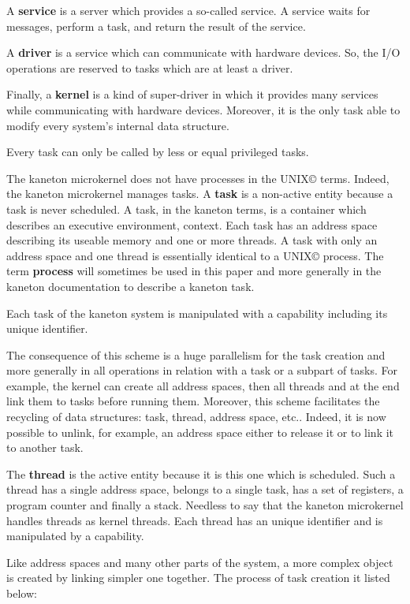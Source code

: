 \begin{multicols}{2}
A \textbf{service} is a server which provides a so-called service. A service
waits for messages, perform a task, and return the result of the service.

A \textbf{driver} is a service which can communicate with hardware devices.
So, the I/O operations are reserved to tasks which are at least a driver.

Finally, a \textbf{kernel} is a kind of super-driver in which it provides
many services while communicating with hardware devices. Moreover, it is
the only task able to modify every system's internal data structure.

Every task can only be called by less or equal privileged tasks.

The kaneton microkernel does not have processes in the
UNIX{\scriptsize \copyright} terms. Indeed, the kaneton microkernel manages
tasks. A \textbf{task} is a non-active entity because a task is never scheduled.
A task, in the kaneton terms, is a container which describes an executive
environment, context. Each task has an address space describing its useable
memory and one or more threads. A task with only an address space and one
thread is essentially identical to a UNIX{\scriptsize \copyright} process.
The term \textbf{process} will sometimes be used in this paper and more
generally in the kaneton documentation to describe a kaneton task.

Each task of the kaneton system is manipulated with a capability including
its unique identifier.

The consequence of this scheme is a huge parallelism for the
task creation and more generally in all operations in relation with
a task or a subpart of tasks. For example, the kernel can create all
address spaces, then all threads and at the end link them to tasks before
running them. Moreover, this scheme facilitates the recycling of data
structures: task, thread, address space, etc.. Indeed, it is now possible to
unlink, for example, an address space either to release it or to link it to
another task.

The \textbf{thread} is the active entity because it is this one which is
scheduled. Such a thread has a single address space, belongs to a single
task, has a set of registers, a program counter and finally a stack.
Needless to say that the kaneton microkernel handles threads as kernel threads.
Each thread has an unique identifier and is manipulated by a capability.

Like address spaces and many other parts of the system, a more complex
object is created by linking simpler one together. The process of task creation
it listed below:


\end{multicols}
